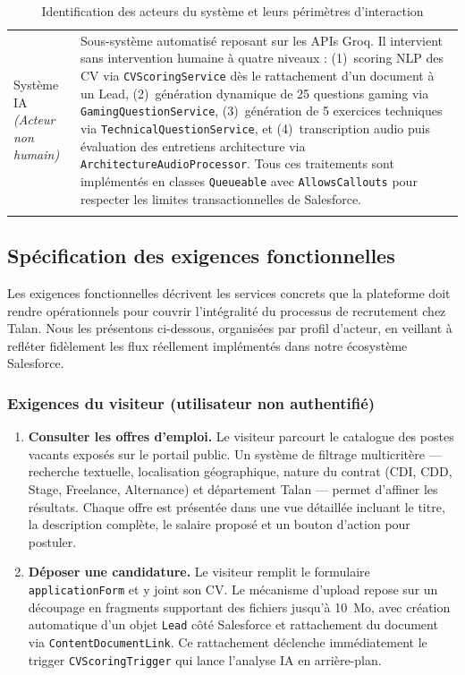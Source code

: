 \begin{longtable}{|p{3.5cm}|p{11.5cm}|}
Système IA \newline\textit{(Acteur non humain)} & Sous-système automatisé reposant sur les APIs Groq. Il intervient sans intervention humaine à quatre niveaux : (1)~scoring NLP des CV via \texttt{CVScoringService} dès le rattachement d'un document à un Lead, (2)~génération dynamique de 25 questions gaming via \texttt{GamingQuestionService}, (3)~génération de 5 exercices techniques via \texttt{TechnicalQuestionService}, et (4)~transcription audio puis évaluation des entretiens architecture via \texttt{ArchitectureAudioProcessor}. Tous ces traitements sont implémentés en classes \texttt{Queueable} avec \texttt{AllowsCallouts} pour respecter les limites transactionnelles de Salesforce. \\

\caption{Identification des acteurs du système et leurs périmètres d'interaction}
\label{tab:acteurs}
\end{longtable}

\FloatBarrier

\subsection{Spécification des exigences fonctionnelles}

Les exigences fonctionnelles décrivent les services concrets que la plateforme doit rendre opérationnels pour couvrir l'intégralité du processus de recrutement chez Talan. Nous les présentons ci-dessous, organisées par profil d'acteur, en veillant à refléter fidèlement les flux réellement implémentés dans notre écosystème Salesforce.

\subsubsection{Exigences du visiteur (utilisateur non authentifié)}

\begin{enumerate}[label=\textbf{EF-V\arabic*}]
    \item \textbf{Consulter les offres d'emploi.} Le visiteur parcourt le catalogue des postes vacants exposés sur le portail public. Un système de filtrage multicritère --- recherche textuelle, localisation géographique, nature du contrat (CDI, CDD, Stage, Freelance, Alternance) et département Talan --- permet d'affiner les résultats. Chaque offre est présentée dans une vue détaillée incluant le titre, la description complète, le salaire proposé et un bouton d'action pour postuler.
    
    \item \textbf{Déposer une candidature.} Le visiteur remplit le formulaire \texttt{applicationForm} et y joint son CV. Le mécanisme d'upload repose sur un découpage en fragments supportant des fichiers jusqu'à 10~Mo, avec création automatique d'un objet \texttt{Lead} côté Salesforce et rattachement du document via \texttt{ContentDocumentLink}. Ce rattachement déclenche immédiatement le trigger \texttt{CVScoringTrigger} qui lance l'analyse IA en arrière-plan.
\end{enumerate}

